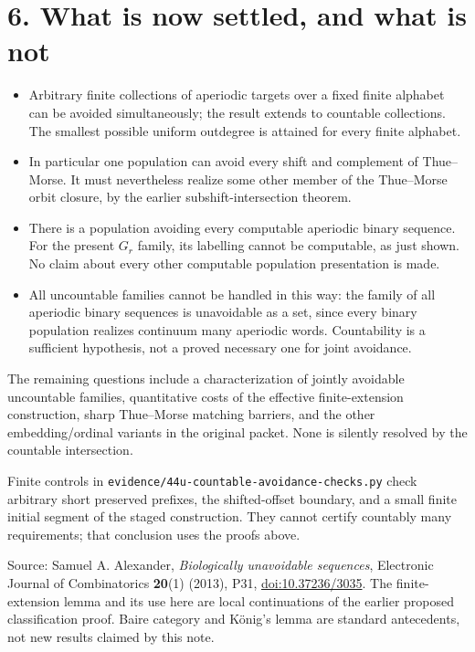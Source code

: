 \documentclass[
  11pt,
]{article}
\providecommand{\tightlist}{%
  \setlength{\itemsep}{0pt}\setlength{\parskip}{0pt}}
\begin{document}
\section{6. What is now settled, and what is
not}\label{what-is-now-settled-and-what-is-not}

\begin{itemize}
\tightlist
\item
  Arbitrary finite collections of aperiodic targets over a fixed finite
  alphabet can be avoided simultaneously; the result extends to
  countable collections. The smallest possible uniform outdegree is
  attained for every finite alphabet.
\item
  In particular one population can avoid every shift and complement of
  Thue--Morse. It must nevertheless realize some other member of the
  Thue--Morse orbit closure, by the earlier subshift-intersection
  theorem.
\item
  There is a population avoiding every computable aperiodic binary
  sequence. For the present \(G_r\) family, its labelling cannot be
  computable, as just shown. No claim about every other computable
  population presentation is made.
\item
  All uncountable families cannot be handled in this way: the family of
  all aperiodic binary sequences is unavoidable as a set, since every
  binary population realizes continuum many aperiodic words.
  Countability is a sufficient hypothesis, not a proved necessary one
  for joint avoidance.
\end{itemize}

The remaining questions include a characterization of jointly avoidable
uncountable families, quantitative costs of the effective
finite-extension construction, sharp Thue--Morse matching barriers, and
the other embedding/ordinal variants in the original packet. None is
silently resolved by the countable intersection.

Finite controls in \texttt{evidence/44u-countable-avoidance-checks.py}
check arbitrary short preserved prefixes, the shifted-offset boundary,
and a small finite initial segment of the staged construction. They
cannot certify countably many requirements; that conclusion uses the
proofs above.

Source: Samuel A. Alexander, \emph{Biologically unavoidable sequences},
Electronic Journal of Combinatorics \textbf{20}(1) (2013), P31,
\href{https://doi.org/10.37236/3035}{doi:10.37236/3035}. The
finite-extension lemma and its use here are local continuations of the
earlier proposed classification proof. Baire category and König's lemma
are standard antecedents, not new results claimed by this note.
\end{document}
